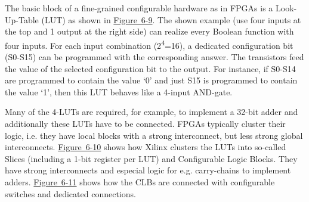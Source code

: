\documentclass[
]{article}
\begin{document}
The basic block of a fine-grained configurable hardware as in FPGAs is a
Look-Up-Table (LUT) as shown in \protect\hyperlink{Fig69}{Figure~6-9}.
The shown example (use four inputs at the top and 1 output at the right
side) can realize every Boolean function with four inputs. For each
input combination (2\textsuperscript{4}=16), a dedicated configuration
bit (S0-S15) can be programmed with the corresponding answer. The
transistors feed the value of the selected configuration bit to the
output. For instance, if S0-S14 are programmed to contain the value `0'
and just S15 is programmed to contain the value `1', then this LUT
behaves like a 4-input AND-gate.

Many of the 4-LUTs are required, for example, to implement a 32-bit
adder and additionally these LUTs have to be connected. FPGAs typically
cluster their logic, i.e. they have local blocks with a strong
interconnect, but less strong global interconnects.
\protect\hyperlink{Fig610}{Figure~6-10} shows how Xilinx clusters the
LUTs into so-called Slices (including a 1-bit register per LUT) and
Configurable Logic Blocks. They have strong interconnects and especial
logic for e.g. carry-chains to implement adders.
\protect\hyperlink{Fig611}{Figure~6-11} shows how the CLBs are connected
with configurable switches and dedicated connections.
\end{document}
